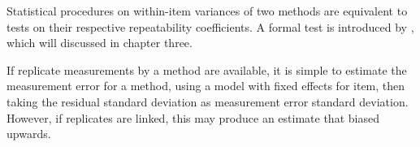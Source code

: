 \documentclass[12pt, a4paper]{report}
\theoremstyle{plain}
\theoremstyle{definition}
\theoremstyle{remark}
\begin{document}
	
		
Statistical procedures on within-item variances of two methods are equivalent to tests on their respective repeatability coefficients. A formal test is introduced by \citet{ARoy2009}, which will discussed in chapter three.
		
	
	If replicate measurements by a method are available, it is simple to estimate the measurement error for a method, using a model with fixed effects for item, then taking the residual standard deviation as measurement error standard deviation. However, if replicates are linked, this may produce an estimate that biased upwards.
	
	

	
	

		
	
	
	
	
	



	
	
	
	
	
	
	
	
	
	
	
\end{document}
